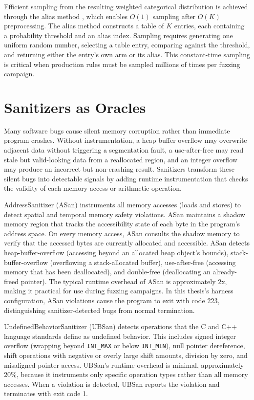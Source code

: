 Efficient sampling from the resulting weighted categorical distribution is achieved through the alias method \cite{loadeddice}, which enables $O(1)$ sampling after $O(K)$ preprocessing. The alias method constructs a table of $K$ entries, each containing a probability threshold and an alias index. Sampling requires generating one uniform random number, selecting a table entry, comparing against the threshold, and returning either the entry's own arm or its alias. This constant-time sampling is critical when production rules must be sampled millions of times per fuzzing campaign.

\section{Sanitizers as Oracles}
\label{sec:bg-sanitizers}

Many software bugs cause silent memory corruption rather than immediate program crashes. Without instrumentation, a heap buffer overflow may overwrite adjacent data without triggering a segmentation fault, a use-after-free may read stale but valid-looking data from a reallocated region, and an integer overflow may produce an incorrect but non-crashing result. Sanitizers transform these silent bugs into detectable signals by adding runtime instrumentation that checks the validity of each memory access or arithmetic operation.

AddressSanitizer (ASan) \cite{asan} instruments all memory accesses (loads and stores) to detect spatial and temporal memory safety violations. ASan maintains a shadow memory region that tracks the accessibility state of each byte in the program's address space. On every memory access, ASan consults the shadow memory to verify that the accessed bytes are currently allocated and accessible. ASan detects heap-buffer-overflow (accessing beyond an allocated heap object's bounds), stack-buffer-overflow (overflowing a stack-allocated buffer), use-after-free (accessing memory that has been deallocated), and double-free (deallocating an already-freed pointer). The typical runtime overhead of ASan is approximately 2x, making it practical for use during fuzzing campaigns. In this thesis's harness configuration, ASan violations cause the program to exit with code 223, distinguishing sanitizer-detected bugs from normal termination.

UndefinedBehaviorSanitizer (UBSan) detects operations that the C and C++ language standards define as undefined behavior. This includes signed integer overflow (wrapping beyond \texttt{INT\_MAX} or below \texttt{INT\_MIN}), null pointer dereference, shift operations with negative or overly large shift amounts, division by zero, and misaligned pointer access. UBSan's runtime overhead is minimal, approximately 20\%, because it instruments only specific operation types rather than all memory accesses. When a violation is detected, UBSan reports the violation and terminates with exit code 1.

